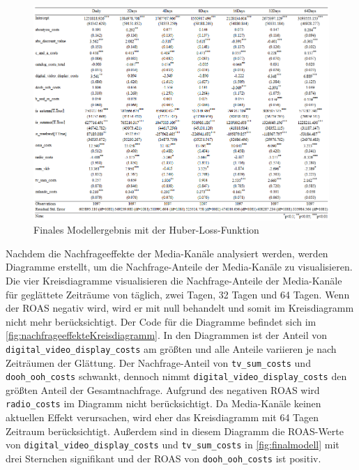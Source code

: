\begin{figure}[H]
    \centering
    \includegraphics[width=1\linewidth]{images/finalhuber.png}
    \caption{Finales Modellergebnis mit der Huber-Loss-Funktion}
    \label{fig:finalhuber}
\end{figure}
Nachdem die Nachfrageeffekte der Media-Kanäle analysiert werden, werden Diagramme erstellt, um die Nachfrage-Anteile der Media-Kanäle zu visualisieren. Die vier Kreisdiagramme visualisieren die Nachfrage-Anteile der Media-Kanäle für geglättete Zeiträume von täglich, zwei Tagen, 32 Tagen und 64 Tagen. Wenn der \ac{ROAS} negativ wird, wird er mit null behandelt und somit im Kreisdiagramm nicht mehr berücksichtigt. Der Code für die Diagramme befindet sich im \autoref{fig:nachfrageeffekteKreisdiagramm}. In den Diagrammen ist der Anteil von \verb|digital_video_display_costs| am größten und alle Anteile variieren je nach Zeiträumen der Glättung. Der Nachfrage-Anteil von \verb|tv_sum_costs| und \verb|dooh_ooh_costs| schwankt, dennoch nimmt \verb|digital_video_display_costs| den größten Anteil der Gesamtnachfrage. Aufgrund des negativen \ac{ROAS} wird \verb|radio_costs| im Diagramm nicht berücksichtigt. Da Media-Kanäle keinen aktuellen Effekt verursachen, wird eher das Kreisdiagramm mit 64 Tagen Zeitraum berücksichtigt. Außerdem sind in diesem Diagramm die \ac{ROAS}-Werte von \verb|digital_video_display_costs| und \verb|tv_sum_costs| in \autoref{fig:finalmodell} mit drei Sternchen signifikant und der \ac{ROAS} von \verb|dooh_ooh_costs| ist positiv.

